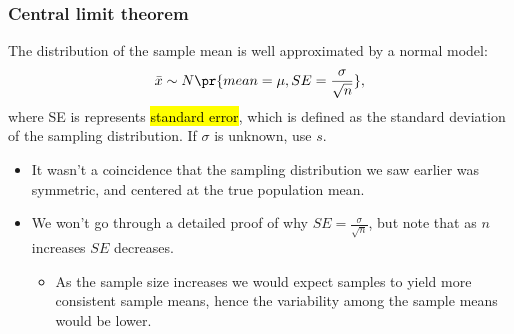 
\begin{frame}
\frametitle{Central limit theorem}

{The distribution of the sample mean is well approximated by a normal model:
\[ \bar{x} \sim N \pr{ mean = \mu, SE = \frac{\sigma}{\sqrt{n}} }, \]
where SE is represents \hl{standard error}, which is defined as the standard deviation of the sampling distribution. If $\sigma$ is unknown, use $s$.
}

\begin{itemize}

\item It wasn't a coincidence that the sampling distribution we saw earlier was symmetric, and centered at the true population mean.

\item We won't go through a detailed proof of why $SE =  \frac{\sigma}{\sqrt{n}}$, but note that as $n$ increases $SE$ decreases. 
\begin{itemize}
\item As the sample size increases we would expect samples to yield more consistent sample means, hence the variability among the sample means would be lower.
\end{itemize}

\end{itemize}

\end{frame}


